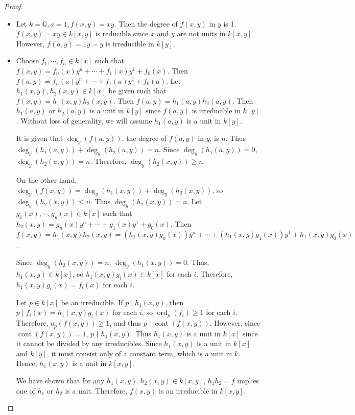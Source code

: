 \documentclass[12pt, psamsfonts]{amsart}
\theoremstyle{definition}
\theoremstyle{remark}
\DeclareMathOperator{\ord}{ord}
\DeclareMathOperator{\cont}{cont}
\numberwithin{equation}{section}
\begin{document}
\begin{proof}
  $ $
  \begin{itemize}
    \item
      Let $k = \mathbb{Q}, a = 1, f(x, y) = xy$.
      Then the degree of $f(x, y)$ in $y$ is 1.
      $f(x, y) = xy \in k[x, y]$ is reducible since $x$ and $y$ are not units in $k[x, y]$.
      However, $f(a, y) = 1y = y$ is irreducible in $k[y]$.
    \item
      Choose $f_1, \cdots, f_n \in k[x]$ such that $f(x, y) = f_n(x)y^n + \cdots + f_1(x)y^1 + f_0(x)$.
      Then $f(a, y) = f_n(a)y^n + \cdots + f_1(a)y^1 + f_0(a)$.
      Let $h_1(x, y), h_2(x, y) \in k[x]$ be given such that $f(x, y) = h_1(x, y)h_2(x, y)$.
      Then $f(a, y) = h_1(a, y)h_2(a, y)$.
      Then $h_1(a, y)$ or $h_2(a, y)$ is a unit in $k[y]$ since $f(a, y)$ is irreducible in $k[y]$.
      Without loss of generality, we will assume $h_1(a, y)$ is a unit in $k[y]$.

      It is given that $\deg_y(f(a, y))$, the degree of $f(a, y)$ in $y$, is $n$.
      Thus $\deg_y(h_1(a, y)) + \deg_y(h_2(a, y)) = n$.
      Since $\deg_y(h_1(a, y)) = 0$, $\deg_y(h_2(a, y)) = n$.
      Therefore, $\deg_y(h_2(x, y)) \geq n$.

      On the other hand, $\deg_y(f(x, y)) = \deg_y(h_1(x, y)) + \deg_y(h_2(x, y))$, so $\deg_y(h_2(x, y)) \leq n$.
      Thus $\deg_y(h_2(x, y)) = n$.
      Let $g_1(x), \cdots, g_n(x) \in k[x]$ such that $h_2(x, y) = g_n(x)y^n + \cdots + g_1(x)y^1 + g_0(x)$.
      Then $f(x, y) = h_1(x, y)h_2(x, y) = (h_1(x, y)g_n(x))y^n + \cdots + (h_1(x, y)g_1(x))y^1 + h_1(x, y)g_0(x)$.

      Since $\deg_y(h_2(x, y)) = n$, $\deg_y(h_1(x, y)) = 0$.
      Thus, $h_1(x, y) \in k[x]$, so $h_1(x, y)g_i(x) \in k[x]$ for each $i$.
      Therefore, $h_1(x, y)g_i(x) = f_i(x)$ for each $i$.

      Let $p \in k[x]$ be an irreducible.
      If $p \mid h_1(x, y)$, then $p \mid f_i(x) = h_1(x, y)g_i(x)$ for each $i$, so $\ord_p(f_i) \geq 1$ for each $i$.
      Therefore, $o_p(f(x, y)) \geq 1$, and thus $p \mid \cont(f(x, y))$.
      However, since $\cont(f(x, y)) = 1$, $p \nmid h_1(x, y)$.
      Thus $h_1(x, y)$ is a unit in $k[x]$ since it cannot be divided by any irreducibles.
      Since $h_1(x, y)$ is a unit in $k[x]$ and $k[y]$, it must consist only of a constant term, which is a unit in $k$.
      Hence, $h_1(x, y)$ is a unit in $k[x, y]$.
      
      We have shown that for any $h_1(x, y), h_2(x, y) \in k[x, y]$, $h_1h_2 = f$ implies one of $h_1$ or $h_2$ is a unit.
      Therefore, $f(x, y)$ is an irreducible in $k[x, y]$.


\end{itemize}
\end{proof}
\end{document}
